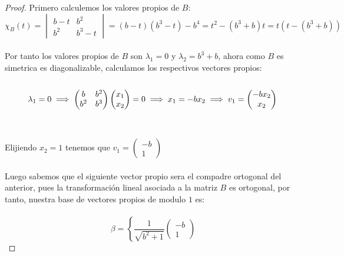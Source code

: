 \documentclass[11pt]{article}
\begin{document}
\begin{proof}
    Primero calculemos los valores propios de $B$:\,\\
    \begin{equation*}
        \chi_B(t)=\begin{vmatrix}
            b-t&b^2\\
            b^2&b^3-t
        \end{vmatrix}=(b-t)(b^3-t)-b^4=t^2-(b^3+b)t=t(t-(b^3+b))
    \end{equation*}\,\\
    Por tanto los valores propios de $B$ son $\lambda_1=0$ y $\lambda_2=b^3+b$, ahora como $B$ es simetrica es diagonalizable, calculamos los respectivos vectores propios:\,\\
    \,\\
    \begin{equation*}
        \lambda_1=0\implies \begin{pmatrix}
            b&b^2\\
            b^2&b^3
        \end{pmatrix}\begin{pmatrix}
            x_1\\
            x_2
        \end{pmatrix}=0\implies x_1=-bx_2\implies v_1=\begin{pmatrix}
            -bx_2\\
            x_2
        \end{pmatrix}\,\\
    \end{equation*}\,\\
    \,\\
    Elijiendo $x_2=1$ tenemos que $v_1=\begin{pmatrix}
        -b\\
        1
    \end{pmatrix}$\\
    \,\\
    Luego sabemos que el siguiente vector propio sera el compadre ortogonal del anterior, pues la transformaci\'on lineal asociada a la matriz $B$ es ortogonal, por tanto, nuestra base de vectores propios de modulo $1$ es:\,\\
    \,\\
    \begin{equation*}
        \beta=\left\{
        \frac{1}{\sqrt{b^2+1}}\begin{pmatrix}
            -b\\
            1

\end{pmatrix}
\end{equation*}
\end{proof}
\end{document}
